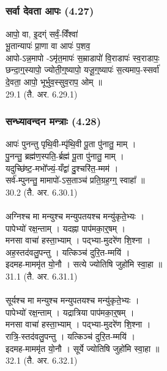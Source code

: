 \subsection{}
\subsubsection{सर्वा देवता आपः (4.27)}
आपो॒ वा, इ॒दग्ं सर्वं॒-विँश्वा॑ \\
भू॒तान्यापः॑ प्रा॒णा वा आपः॑ प॒शव॒ \\
आपो-ऽन्न॒मापो -ऽमृ॑त॒मापः॑ स॒म्राडापो॑ वि॒राडापः॑ स्व॒राडापः॒\\
छन्दा॒ग्॒स्यापो॒ ज्योती॒ग्॒ष्यापो॒ यजू॒ग्॒ष्यापः॑ स॒त्यमाप॒-स्सर्वा॑ \\
दे॒वता॒ आपो॒ भूर्भुव॒स्सुव॒राप॒ ओम् ॥ \\
29.1 (तै. अर. 6.29.1)

\subsubsection{सन्ध्यावन्दन मन्त्राः (4.28)}
आपः॑ पुनन्तु पृथि॒वी-म्पृ॑थि॒वी पू॒ता पु॑नातु॒ माम् ।\\
पु॒नन्तु॒ ब्रह्म॑ण॒स्पति॒-र्ब्रह्म॑ पू॒ता पु॑नातु॒ माम् ।\\
यदुच्छि॑ष्ट॒-मभो᳚ज्यं॒-यँद्वा॑ दु॒श्चरि॑त॒-म्मम॑ ।\\
सर्व॑-म्पुनन्तु॒ मामापो॑-ऽस॒ताञ्च॑ प्रति॒ग्रह॒ग्ग्॒ स्वाहा᳚ ॥\\
30.2 (तै. अर. 6.30.1)\\
\\
अग्निश्च मा मन्युश्च मन्युपतयश्च मन्यु॑कृते॒भ्यः ।\\
पापेभ्यो॑ रक्ष॒न्ताम् । यदह्ना पाप॑मका॒र्॒षम् ।\\
मनसा वाचा॑ हस्ता॒भ्याम् । पद्भ्या-मुदरे॑ण शि॒श्ना ।\\
अह॒स्तद॑वलु॒पन्तु । यत्किञ्च॑ दुरि॒त-म्मयि॑ ।\\
इदमह-माममृ॑त यो॒नौ । सत्ये ज्योतिषि जुहो॑मि स्वा॒हा ॥ \\
31.1 (तै. अर. 6.31.1)\\
\\
सूर्यश्च मा मन्युश्च मन्युपतयश्च मन्यु॑कृते॒भ्यः ।\\
पापेभ्यो॑ रक्ष॒न्ताम् । यद्रात्रिया पाप॑मका॒र्॒षम् ।\\
मनसा वाचा॑ हस्ता॒भ्याम् । पद्भ्या-मुदरे॑ण शि॒श्ना ।\\
रात्रि॒-स्तद॑वलु॒पन्तु । यत्किञ्च॑ दुरि॒त-म्मयि॑ ।\\
इदमह-माममृ॑त यो॒नौ । सूर्ये ज्योतिषि जुहो॑मि स्वा॒हा ॥ \\
32.1 (तै. अर. 6.32.1)\\

